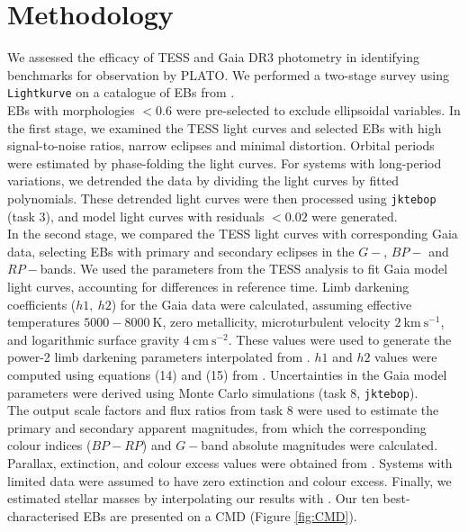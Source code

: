 \section{Methodology}\label{sec:Method}

We assessed the efficacy of TESS and Gaia DR3 photometry in identifying benchmarks for observation by PLATO. We performed a two-stage survey using \verb|Lightkurve| on a catalogue of EBs from \citet{Prsa22}.\\

EBs with morphologies $< 0.6$ were pre-selected to exclude ellipsoidal variables. In the first stage, we examined the TESS light curves and selected EBs with high signal-to-noise ratios, narrow eclipses and minimal distortion. Orbital periods were estimated by phase-folding the light curves. For systems with long-period variations, we detrended the data by dividing the light curves by fitted polynomials. These detrended light curves were then processed using \verb|jktebop| (task 3), and model light curves with residuals $< 0.02$ were generated.\\

In the second stage, we compared the TESS light curves with corresponding Gaia data, selecting EBs with primary and secondary eclipses in the $G-$, $BP-$ and $RP-$bands. We used the parameters from the TESS analysis to fit Gaia model light curves, accounting for differences in reference time. Limb darkening coefficients ($h1,\ h2$) for the Gaia data were calculated, assuming effective temperatures $5000-8000 \mathrm{\ K}$, zero metallicity, microturbulent velocity $2 \mathrm{\ km \ s^{-1}}$, and logarithmic surface gravity $4 \mathrm{\ cm\ s^{-2}}$. These values were used to generate the power-2 limb darkening parameters interpolated from \citet{Claret22}. $h1$ and $h2$ values were computed using equations (14) and (15) from \citet{Southworth23}. Uncertainties in the Gaia model parameters were derived using Monte Carlo simulations (task 8, \verb|jktebop|). \\

The output scale factors and flux ratios from task 8 were used to estimate the primary and secondary apparent magnitudes, from which the corresponding colour indices ($BP-RP$) and $G-$band absolute magnitudes were calculated. Parallax, extinction, and colour excess values were obtained from \citet{Gaia23}. Systems with limited data were assumed to have zero extinction and colour excess. Finally, we estimated stellar masses by interpolating our results with \citet{Mamajek22}. Our ten best-characterised EBs are presented on a CMD (Figure \ref{fig:CMD}).
